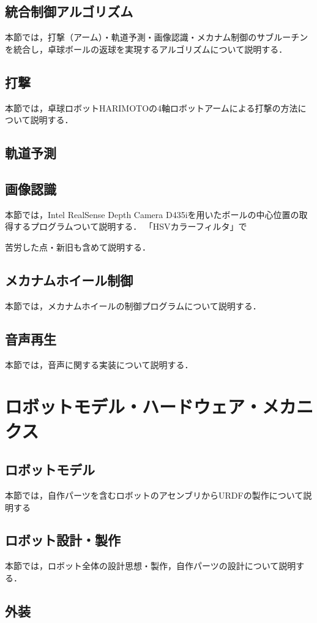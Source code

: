 \documentclass[11pt, oneside, titlepage]{jarticle}
\begin{document}
\subsection{統合制御アルゴリズム}
本節では，打撃（アーム）・軌道予測・画像認識・メカナム制御のサブルーチンを統合し，卓球ボールの返球を実現するアルゴリズムについて説明する．
\subsection{打撃}
本節では，卓球ロボットHARIMOTOの4軸ロボットアームによる打撃の方法について説明する．
\subsection{軌道予測}
\subsection{画像認識}
本節では，Intel RealSense Depth Camera D435iを用いたボールの中心位置の取得するプログラムついて説明する．
「HSVカラーフィルタ」で

苦労した点・新旧も含めて説明する．\cite{detect2}
\subsection{メカナムホイール制御}
本節では，メカナムホイールの制御プログラムについて説明する．\cite{mecanum}
\subsection{音声再生}
本節では，音声に関する実装について説明する．\cite{sound}
\section{ロボットモデル・ハードウェア・メカニクス}
\subsection{ロボットモデル}
本節では，自作パーツを含むロボットのアセンブリからURDFの製作について説明する
\subsection{ロボット設計・製作}
本節では，ロボット全体の設計思想・製作，自作パーツの設計について説明する．

\subsection{外装}
\end{document}
